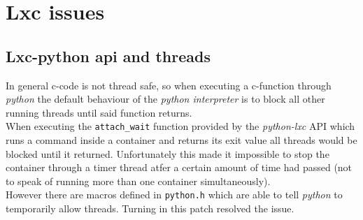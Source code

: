 \chapter{Lxc issues}

\section{Lxc-python api and threads}

In general c-code is not thread safe, so when executing a c-function through \textit{python} the default
behaviour of the \textit{python interpreter} is to block all other running threads until said function returns\cite{gil}.\\
When executing the \texttt{attach\_wait} function provided by the \textit{python-lxc} API which runs a command
inside a container and returns its exit value
all threads would be blocked until it returned. Unfortunately
this made it impossible to stop the container through a timer thread atfer a certain amount of time had
passed (not to speak of running more than one container simultaneously).\\
However there are macros defined in \texttt{python.h} which are able to tell \textit{python} to temporarily allow threads.
Turning in this patch\cite{bugreport} resolved the issue.
